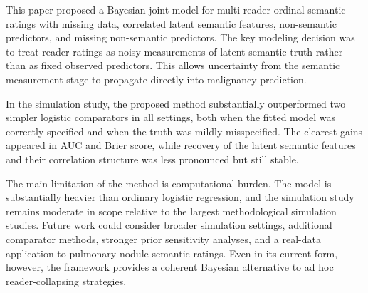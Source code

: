 \documentclass[twoside,11pt]{article}
\begin{document}
This paper proposed a Bayesian joint model for multi-reader ordinal semantic ratings with missing data, correlated latent semantic features, non-semantic predictors, and missing non-semantic predictors. The key modeling decision was to treat reader ratings as noisy measurements of latent semantic truth rather than as fixed observed predictors. This allows uncertainty from the semantic measurement stage to propagate directly into malignancy prediction.

In the simulation study, the proposed method substantially outperformed two simpler logistic comparators in all settings, both when the fitted model was correctly specified and when the truth was mildly misspecified. The clearest gains appeared in AUC and Brier score, while recovery of the latent semantic features and their correlation structure was less pronounced but still stable.

The main limitation of the method is computational burden. The model is substantially heavier than ordinary logistic regression, and the simulation study remains moderate in scope relative to the largest methodological simulation studies. Future work could consider broader simulation settings, additional comparator methods, stronger prior sensitivity analyses, and a real-data application to pulmonary nodule semantic ratings. Even in its current form, however, the framework provides a coherent Bayesian alternative to ad hoc reader-collapsing strategies.


\end{document}
